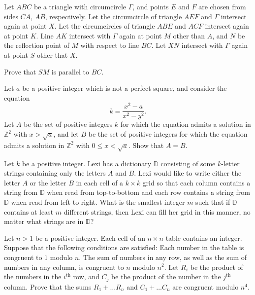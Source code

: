 \documentclass[11pt]{scrartcl}
\begin{document}
\begin{problem}[5897111412933990257]
Let $ABC$ be a triangle with circumcircle $\Gamma$, and points $E$ and $F$ are chosen from sides $CA$, $AB$, respectively. Let the circumcircle of triangle $AEF$ and $\Gamma$ intersect again at point $X$. Let the circumcircles of triangle $ABE$ and $ACF$ intersect again at point $K$. Line $AK$ intersect with $\Gamma$ again at point $M$ other than $A$, and $N$ be the reflection point of $M$ with respect to line $BC$. Let $XN$ intersect with $\Gamma$ again at point $S$ other that $X$.

Prove that $SM$ is parallel to $BC$.
\end{problem}
\begin{problem}[709130660277794345]
	Let $a$ be a positive integer which is not a perfect square, and consider the equation\[k = \frac{x^2-a}{x^2-y^2}.\]Let $A$ be the set of positive integers $k$ for which the equation admits a solution in $\mathbb Z^2$ with $x>\sqrt{a}$, and let $B$ be the set of positive integers for which the equation admits a solution in $\mathbb Z^2$ with $0\leq x<\sqrt{a}$. Show that $A=B$.
\end{problem}
\begin{problem}[1547794310266184263]
Let $k$ be a positive integer. Lexi has a dictionary $\mathbb{D}$ consisting of some $k$-letter strings containing only the letters $A$ and $B$. Lexi would like to write either the letter $A$ or the letter $B$ in each cell of a $k \times k$ grid so that each column contains a string from $\mathbb{D}$ when read from top-to-bottom and each row contains a string from $\mathbb{D}$ when read from left-to-right.
What is the smallest integer $m$ such that if $\mathbb{D}$ contains at least $m$ different strings, then Lexi can fill her grid in this manner, no matter what strings are in $\mathbb{D}$?
\end{problem}
\begin{problem}[1248852037865425410]
Let $n>1$ be a positive integer. Each cell of an $n\times n$ table contains an integer. Suppose that the following conditions are satisfied:
Each number in the table is congruent to $1$ modulo $n$.
The sum of numbers in any row, as well as the sum of numbers in any column, is congruent to $n$ modulo $n^2$.
Let $R_i$ be the product of the numbers in the $i^{\text{th}}$ row, and $C_j$ be the product of the number in the $j^{\text{th}}$ column. Prove that the sums $R_1+\hdots R_n$ and $C_1+\hdots C_n$ are congruent modulo $n^4$.
\end{problem}
\end{document}
